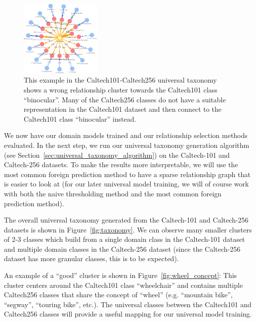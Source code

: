 \begin{figure}[ht]
      \centering
      \includegraphics[width=0.35\textwidth]{figures/bad_taxonomy.png}

      \caption{This example in the Caltech101-Caltech256 universal taxonomy shows a wrong relationship
            cluster towards the Caltech101 class \enquote{binocular}. Many of the Caltech256 classes
            do not have a suitable representation in the Caltech101 dataset
            and then connect to the Caltech101 class \enquote{binocular} instead.}
      \label{fig:bad_taxonomy}
\end{figure}

We now have our domain models trained and our relationship selection methods evaluated.
In the next step, we run our universal taxonomy generation algorithm
(see Section~\ref{sec:universal_taxonomy_algorithm}) on the Caltech-101 and
Caltech-256 datasets. To make the results more interpretable,
we will use the most common foreign prediction method to have a sparse relationship graph
that is easier to look at
(for our later universal model training, we will of course work with both the naive thresholding method and the most common foreign prediction method).

The overall universal taxonomy generated from the Caltech-101 and Caltech-256 datasets
is shown in Figure~\ref{fig:taxonomy}.
We can observe many smaller clusters of 2-3 classes which build from a single domain class in
the Caltech-101 dataset and multiple domain classes in the Caltech-256 dataset
(since the Caltech-256 dataset has more granular classes, this is to be expected).

An example of a \enquote{good} cluster is shown in Figure~\ref{fig:wheel_concept}:
This cluster centers around the Caltech101 class \enquote{wheelchair} and contains
multiple Caltech256 classes that share the concept of \enquote{wheel} (e.g. \enquote{mountain bike}, \enquote{segway}, \enquote{touring bike}, etc.).
The universal classes between the Caltech101 and Caltech256 classes
will provide a useful mapping for our universal model training.

